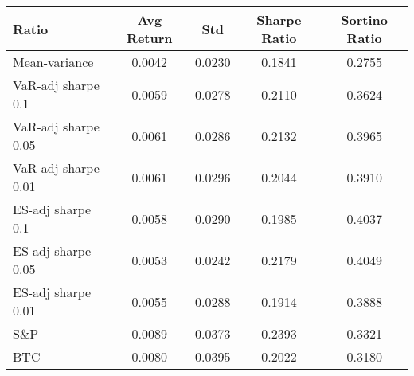 \begin{tabular}{lcccc}
\toprule
Ratio & Avg Return & Std & Sharpe Ratio & Sortino Ratio\\
\midrule
Mean-variance & 0.0042 & 0.0230 & 0.1841 & 0.2755\\
VaR-adj sharpe 0.1 & 0.0059 & 0.0278 & 0.2110 & 0.3624\\
VaR-adj sharpe 0.05 & 0.0061 & 0.0286 & 0.2132 & 0.3965\\
VaR-adj sharpe 0.01 & 0.0061 & 0.0296 & 0.2044 & 0.3910\\
ES-adj sharpe 0.1 & 0.0058 & 0.0290 & 0.1985 & 0.4037\\
ES-adj sharpe 0.05 & 0.0053 & 0.0242 & 0.2179 & 0.4049\\
ES-adj sharpe 0.01 & 0.0055 & 0.0288 & 0.1914 & 0.3888\\
S\&P & 0.0089 & 0.0373 & 0.2393 & 0.3321\\
BTC & 0.0080 & 0.0395 & 0.2022 & 0.3180\\
\bottomrule
\end{tabular}
